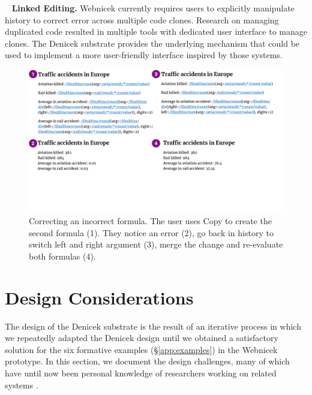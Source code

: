 \documentclass[sigconf,anonymous,screen]{acmart}
\DeclareRobustCommand{\keyideabox}[3]{\begin{tcolorbox}[breakable,
  boxsep=5pt,left=0pt,right=0pt,top=0pt,bottom=0pt,width=\dimexpr\columnwidth\relax,
  colback=gray!20,colframe=gray!20,
  enlarge bottom by=0pt,enlarge top by=0pt,
  arc=0pt,outer arc=0pt]
\lettrine[lraise=0.3]{\LARGE #1}{~}
\small \textbf{#2.} #3
\end{tcolorbox}
}
\begin{document}
\keyideabox{\faClipboard}{Linked Editing}{Webnicek currently requires users to explicitly
manipulate history to correct error across multiple code clones. Research on managing duplicated
code resulted in multiple tools \cite{toomim-2004-linked,duala-ekoko-2008-clone} with dedicated
user interface to manage clones. The Denicek substrate provides the underlying mechanism that
could be used to implement a more user-friendly interface inspired by those systems.}


\begin{figure}[t]
\includegraphics[width=1\columnwidth,clip,trim=0cm 5.5cm 1cm 0cm]{fig/copypaste.pdf}
\vspace{-1.5em}
\caption{Correcting an incorrect formula. The user uses Copy to create the second
formula (1). They notice an error (2), go back in history to switch left and right argument (3),
merge the change and re-evaluate both formulas (4).}
\label{fig:copypaste}
\vspace{-0.5em}
\end{figure}


\section{Design Considerations}
\label{sec:discuss}

The design of the Denicek substrate is the result of an iterative process in which we repeatedly
adapted the Denicek design until we obtained a satisfactory solution for the six formative examples
(\S\ref{app:examples}) in the Webnicek prototype. In this section, we document the design challenges,
many of which have until now been personal knowledge of researchers working on related
systems \cite{jakubovic-2022-ladder,edwards-2005-subtext,hall-2017-infra,omar-2021-livelits}.
\end{document}
